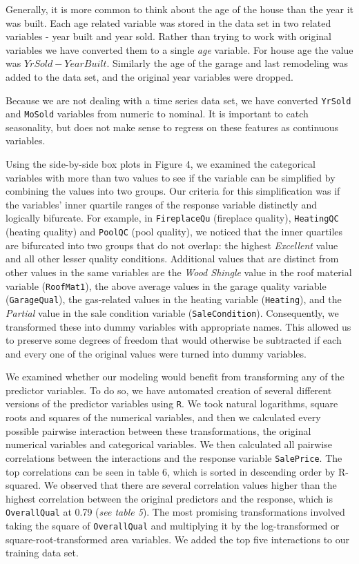 \documentclass[
]{article}
\begin{document}
Generally, it is more common to think about the age of the house than
the year it was built. Each age related variable was stored in the data
set in two related variables - year built and year sold. Rather than
trying to work with original variables we have converted them to a
single \emph{age} variable. For house age the value was
\(YrSold - YearBuilt\). Similarly the age of the garage and last
remodeling was added to the data set, and the original year variables
were dropped.

Because we are not dealing with a time series data set, we have
converted \texttt{YrSold} and \texttt{MoSold} variables from numeric to
nominal. It is important to catch seasonality, but does not make sense
to regress on these features as continuous variables.

Using the side-by-side box plots in Figure 4, we examined the
categorical variables with more than two values to see if the variable
can be simplified by combining the values into two groups. Our criteria
for this simplification was if the variables' inner quartile ranges of
the response variable distinctly and logically bifurcate. For example,
in \texttt{FireplaceQu} (fireplace quality), \texttt{HeatingQC} (heating
quality) and \texttt{PoolQC} (pool quality), we noticed that the inner
quartiles are bifurcated into two groups that do not overlap: the
highest \emph{Excellent} value and all other lesser quality conditions.
Additional values that are distinct from other values in the same
variables are the \emph{Wood Shingle} value in the roof material
variable (\texttt{RoofMat1}), the above average values in the garage
quality variable (\texttt{GarageQual}), the gas-related values in the
heating variable (\texttt{Heating}), and the \emph{Partial} value in the
sale condition variable (\texttt{SaleCondition}). Consequently, we
transformed these into dummy variables with appropriate names. This
allowed us to preserve some degrees of freedom that would otherwise be
subtracted if each and every one of the original values were turned into
dummy variables.

We examined whether our modeling would benefit from transforming any of
the predictor variables. To do so, we have automated creation of several
different versions of the predictor variables using \texttt{R}. We took
natural logarithms, square roots and squares of the numerical variables,
and then we calculated every possible pairwise interaction between these
transformations, the original numerical variables and categorical
variables. We then calculated all pairwise correlations between the
interactions and the response variable \texttt{SalePrice}. The top
correlations can be seen in table 6, which is sorted in descending order
by R-squared. We observed that there are several correlation values
higher than the highest correlation between the original predictors and
the response, which is \texttt{OverallQual} at 0.79 (\emph{see table
5}). The most promising transformations involved taking the square of
\texttt{OverallQual} and multiplying it by the log-transformed or
square-root-transformed area variables. We added the top five
interactions to our training data set.
\end{document}
